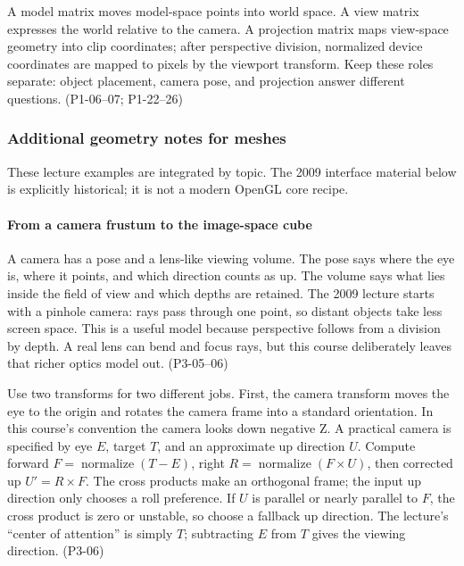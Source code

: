A model matrix moves model-space points into world space. A view matrix expresses the world relative to the camera. A projection matrix maps view-space geometry into clip coordinates; after perspective division, normalized device coordinates are mapped to pixels by the viewport transform. Keep these roles separate: object placement, camera pose, and projection answer different questions. (P1-06--07; P1-22--26)

\subsubsection{Additional geometry notes for meshes}\label{additional-geometry-notes-for-meshes}

These lecture examples are integrated by topic. The 2009 interface material below is explicitly historical; it is not a modern OpenGL core recipe.

\paragraph{From a camera frustum to the image-space cube}\label{from-a-camera-frustum-to-the-image-space-cube}

A camera has a pose and a lens-like viewing volume. The pose says where the eye is, where it points, and which direction counts as up. The volume says what lies inside the field of view and which depths are retained. The 2009 lecture starts with a pinhole camera: rays pass through one point, so distant objects take less screen space. This is a useful model because perspective follows from a division by depth. A real lens can bend and focus rays, but this course deliberately leaves that richer optics model out. (P3-05--06)

Use two transforms for two different jobs. First, the camera transform moves the eye to the origin and rotates the camera frame into a standard orientation. In this course's convention the camera looks down negative Z. A practical camera is specified by eye \(E\), target \(T\), and an approximate up direction \(U\). Compute forward \(F=\operatorname{normalize}(T-E)\), right \(R=\operatorname{normalize}(F\times U)\), then corrected up \(U'=R\times F\). The cross products make an orthogonal frame; the input up direction only chooses a roll preference. If \(U\) is parallel or nearly parallel to \(F\), the cross product is zero or unstable, so choose a fallback up direction. The lecture's ``center of attention'' is simply \(T\); subtracting \(E\) from \(T\) gives the viewing direction. (P3-06)

